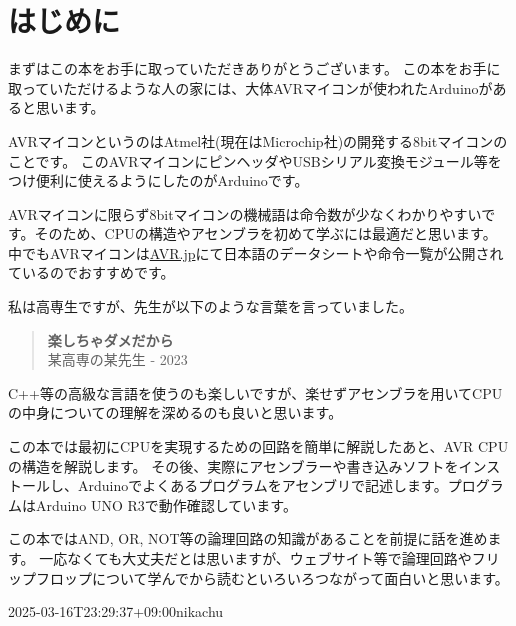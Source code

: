 \documentclass[main.tex]{subfiles}
\begin{document}
\chapter*{はじめに}

まずはこの本をお手に取っていただきありがとうございます。
この本をお手に取っていただけるような人の家には、大体AVRマイコンが使われたArduinoがあると思います。


AVRマイコンというのはAtmel社(現在はMicrochip社)の開発する8bitマイコンのことです。
このAVRマイコンにピンヘッダやUSBシリアル変換モジュール等をつけ便利に使えるようにしたのがArduinoです。

AVRマイコンに限らず8bitマイコンの機械語は命令数が少なくわかりやすいです。そのため、CPUの構造やアセンブラを初めて学ぶには最適だと思います。
中でもAVRマイコンは\url{AVR.jp}にて日本語のデータシートや命令一覧が公開されているのでおすすめです。

私は高専生ですが、先生が以下のような言葉を言っていました。

\begin{verse}
    {\bfseries 楽しちゃダメだから}\\
    某高専の某先生 - 2023
\end{verse}

C++等の高級な言語を使うのも楽しいですが、楽せずアセンブラを用いてCPUの中身についての理解を深めるのも良いと思います。

この本では最初にCPUを実現するための回路を簡単に解説したあと、AVR CPUの構造を解説します。
その後、実際にアセンブラーや書き込みソフトをインストールし、Arduinoでよくあるプログラムをアセンブリで記述します。プログラムはArduino UNO R3で動作確認しています。

この本ではAND, OR, NOT等の論理回路の知識があることを前提に話を進めます。
一応なくても大丈夫だとは思いますが、ウェブサイト等で論理回路やフリップフロップについて学んでから読むといろいろつながって面白いと思います。
\begin{flushright}
    2025-03-16T23:29:37+09:00\;\;nikachu
\end{flushright}
\end{document}
